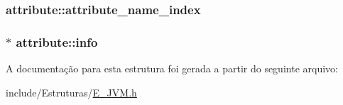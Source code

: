 \subsubsection[{attribute\+\_\+name\+\_\+index}]{ attribute\+::attribute\+\_\+name\+\_\+index}\label{structattribute_a55761ad4a2ed18b8f88baf6ac062cb46}
\hypertarget{structattribute_ac749b125ccc9eda0cfe9deb4fe4aeda9}{}
\subsubsection[{info}]{$\ast$ attribute\+::info}\label{structattribute_ac749b125ccc9eda0cfe9deb4fe4aeda9}


A documentação para esta estrutura foi gerada a partir do seguinte arquivo\+:\begin{DoxyCompactItemize}
\item 
include/\+Estruturas/\hyperlink{_e___j_v_m_8h}{E\+\_\+\+J\+V\+M.\+h}\end{DoxyCompactItemize}
